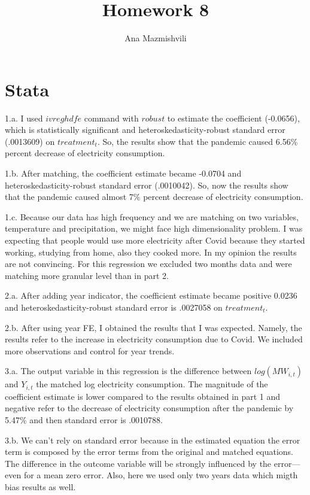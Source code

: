 \documentclass{article}
\title{Homework 8}
\author{Ana Mazmishvili}
\begin{document}
  
\maketitle

\section{Stata}
\noindent 1.a.  I used $ivreghdfe$ command with $robust$ to estimate the coefficient (-0.0656), which is statistically significant and heteroskedasticity-robust standard error (.0013609) on $treatment_t$. So, the results show that the pandemic caused 6.56\% percent decrease of electricity consumption. 


\noindent 1.b. After matching, the coefficient estimate became -0.0704 and heteroskedasticity-robust standard error (.0010042). So, now the results show that the pandemic caused almost 7\% percent decrease of electricity consumption. 


\noindent 1.c. Because our data has high frequency and we are matching on two variables, temperature and precipitation, we might face high dimensionality problem. I was expecting that people would use more electricity after Covid because they started working, studying from home, also they cooked more. In my opinion the results are not convincing. For this regression we excluded two months data and were matching more granular level than in part 2. 

\noindent 2.a.  After adding year indicator, the coefficient estimate became positive 0.0236 and heteroskedasticity-robust standard error is .0027058 on $treatment_t$. 


\noindent 2.b. After using year FE, I obtained the results that I was expected. Namely, the results refer to the increase in electricity consumption due to Covid. We included more observations and control for year trends.  

\noindent 3.a. The output variable in this regression is the difference between  $log(MW_{i,t})$ and $Y_{i,t}$ the matched log electricity consumption. The magnitude of the coefficient estimate is lower compared to the results obtained in part 1 and negative refer to the decrease of electricity consumption after the pandemic by 5.47\% and then standard error is .0010788. 

\noindent 3.b. We can't rely on standard error because in the estimated equation the error term is composed by the error terms from the original and matched equations. The difference in the outcome variable will be strongly influenced by the error—even for a mean zero error. Also, here we used only two years data which migth bias results as well. 
\end{document}
